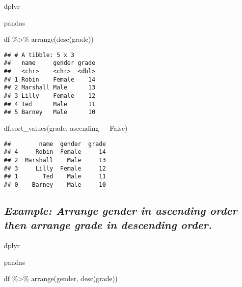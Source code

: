 \documentclass[
]{book}
\newenvironment{Shaded}{\begin{snugshade}}{\end{snugshade}}
\newcommand{\FunctionTok}[1]{\textcolor[rgb]{0.00,0.00,0.00}{#1}}
\newcommand{\NormalTok}[1]{#1}
\newcommand{\OperatorTok}[1]{\textcolor[rgb]{0.81,0.36,0.00}{\textbf{#1}}}
\newcommand{\SpecialCharTok}[1]{\textcolor[rgb]{0.00,0.00,0.00}{#1}}
\newcommand{\StringTok}[1]{\textcolor[rgb]{0.31,0.60,0.02}{#1}}
\newcommand{\VariableTok}[1]{\textcolor[rgb]{0.00,0.00,0.00}{#1}}
\begin{document}
dplyr

pandas

\begin{Shaded}
\begin{Highlighting}[]
\NormalTok{df }\SpecialCharTok{\%\textgreater{}\%} \FunctionTok{arrange}\NormalTok{(}\FunctionTok{desc}\NormalTok{(grade))}
\end{Highlighting}
\end{Shaded}

\begin{verbatim}
## # A tibble: 5 x 3
##   name     gender grade
##   <chr>    <chr>  <dbl>
## 1 Robin    Female    14
## 2 Marshall Male      13
## 3 Lilly    Female    12
## 4 Ted      Male      11
## 5 Barney   Male      10
\end{verbatim}

\begin{Shaded}
\begin{Highlighting}[]
\NormalTok{df.sort\_values(}\StringTok{\textquotesingle{}grade\textquotesingle{}}\NormalTok{, ascending }\OperatorTok{=} \VariableTok{False}\NormalTok{)}
\end{Highlighting}
\end{Shaded}

\begin{verbatim}
##        name  gender  grade
## 4     Robin  Female     14
## 2  Marshall    Male     13
## 3     Lilly  Female     12
## 1       Ted    Male     11
## 0    Barney    Male     10
\end{verbatim}

\hypertarget{example-arrange-gender-in-ascending-order-then-arrange-grade-in-descending-order.}{%
\subsection{\texorpdfstring{\emph{Example: Arrange gender in ascending order then arrange grade in descending order.}}{Example: Arrange gender in ascending order then arrange grade in descending order.}}\label{example-arrange-gender-in-ascending-order-then-arrange-grade-in-descending-order.}}

dplyr

pandas

\begin{Shaded}
\begin{Highlighting}[]
\NormalTok{df }\SpecialCharTok{\%\textgreater{}\%}
  \FunctionTok{arrange}\NormalTok{(gender, }\FunctionTok{desc}\NormalTok{(grade))}
\end{Highlighting}
\end{Shaded}
\end{document}
